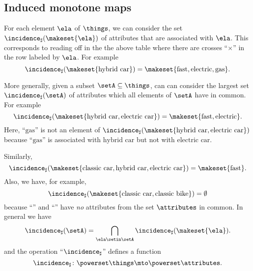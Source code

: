 \subsection{Induced monotone maps}

For each element $\ela$ of $\things$, we can consider the set $\incidence_\sharp(\makeset{\ela})$ of attributes that are associated with $\ela$.
This corresponds to reading off in the the above table where there are crosses ``$\times$'' in the row labeled by $\ela$.
For example
\begin{equation}\label{eq:fca-example-pushforward-1}
    \incidence_\sharp(\makeset{\text{hybrid car}}) = \makeset{\text{fast}, \text{electric}, \text{gas}}.
\end{equation}

More generally, given a subset $\setA \subseteq \things$, can can consider the largest set $\incidence_\sharp(\setA)$ of attributes which all elements of $\setA$ have in common.
For example
\begin{equation}\label{eq:fca-example-pushforward-2}
    \incidence_\sharp(\makeset{\text{hybrid car}, \text{electric car}}) = \makeset{\text{fast}, \text{electric}}.
\end{equation}
Here, ``$\text{gas}$'' is not an element of $\incidence_\sharp(\makeset{\text{hybrid car}, \text{electric car}})$ because ``$\text{gas}$'' is associated with $\text{hybrid car}$ but not with $\text{electric car}$.

Similarly,
\begin{equation}\label{eq:fca-example-pushforward-3}
    \incidence_\sharp(\makeset{\text{classic car}, \text{hybrid car}, \text{electric car}}) = \makeset{\text{fast}}.
\end{equation}
Also, we have, for example,
\begin{equation}\label{eq:fca-example-pushforward-4}
    \incidence_\sharp(\makeset{\text{classic car}, \text{classic bike}}) = \emptyset
\end{equation}
because ``'' and ``'' have \emph{no} attributes from the set $\attributes$ in common.
In general we have
\begin{equation}\label{eq:fca-example-pushforward-5}
    \incidence_\sharp(\setA) = \bigcap_{\ela \setin \setA} \incidence_\sharp(\makeset{\ela}).
\end{equation}
and the operation ``$\incidence_\sharp$'' defines a function
\begin{equation}\label{eq:fca-example-pushforward-6}
    \incidence_\sharp \colon \powerset \things \mto \powerset \attributes.
\end{equation}

